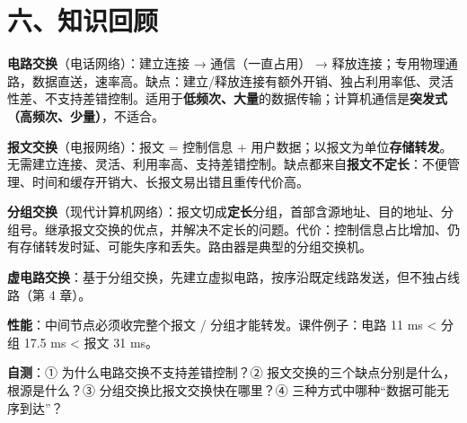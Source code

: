 \documentclass[10.5pt,a4paper,oneside]{article}
\newcommand{\hlred}[1]{\textcolor{wdred}{\bfseries #1}}
\newcommand{\tocback}{\par\vspace{-3pt}{\hfill\footnotesize\hyperlink{toc}{\textcolor{wdgray}{\ensuremath{\uparrow}\,回到目录}}}\par\vspace{-4pt}}
\begin{document}
\hypertarget{ux516dux77e5ux8bc6ux56deux987e}{%
\section{六、知识回顾}\label{ux516dux77e5ux8bc6ux56deux987e}}

\tocback

\begin{summarybox}

\textbf{电路交换}（电话网络）：建立连接 → 通信（一直占用） →
释放连接；专用物理通路，数据直送，速率高。缺点：建立/释放连接有额外开销、独占利用率低、灵活性差、不支持差错控制。适用于\hlred{低频次、大量}的数据传输；计算机通信是\hlred{突发式（高频次、少量）}，不适合。

\textbf{报文交换}（电报网络）：报文 = 控制信息 +
用户数据；以报文为单位\textbf{存储转发}。无需建立连接、灵活、利用率高、支持差错控制。缺点都来自\hlred{报文不定长}：不便管理、时间和缓存开销大、长报文易出错且重传代价高。

\textbf{分组交换}（现代计算机网络）：报文切成\hlred{定长}分组，首部含源地址、目的地址、分组号。继承报文交换的优点，并解决不定长的问题。代价：控制信息占比增加、仍有存储转发时延、可能失序和丢失。路由器是典型的分组交换机。

\textbf{虚电路交换}：基于分组交换，先建立虚拟电路，按序沿既定线路发送，但不独占线路（第
4 章）。

\textbf{性能}：中间节点必须收完整个报文 / 分组才能转发。课件例子：电路
11 ms \textless{} 分组 17.5 ms \textless{} 报文 31 ms。

\textbf{自测}：① 为什么电路交换不支持差错控制？②
报文交换的三个缺点分别是什么，根源是什么？③
分组交换比报文交换快在哪里？④ 三种方式中哪种“数据可能无序到达”？

\end{summarybox}
\end{document}
